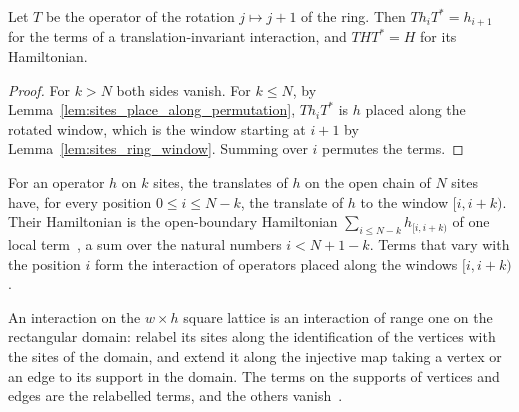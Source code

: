 \begin{lemma}
    \label{lem:hamiltonians_translation_invariant}
    \leanok
    Let $T$ be the operator of the rotation $j\mapsto j+1$ of the ring. Then $Th_iT^*=h_{i+1}$
    for the terms of a translation-invariant interaction, and $THT^*=H$ for its
    Hamiltonian.
\end{lemma}
\begin{proof}\leanok
    For $k>N$ both sides vanish. For $k\le N$, by
    Lemma~\ref{lem:sites_place_along_permutation}, $Th_iT^*$ is $h$ placed along the
    rotated window, which is the window starting at $i+1$ by Lemma~\ref{lem:sites_ring_window}.
    Summing over $i$ permutes the terms.
\end{proof}

\begin{definition}
    \label{def:hamiltonians_chain_translates}
    \leanok
    For an operator $h$ on $k$ sites, the translates of $h$ on the open chain of $N$ sites
    have, for every position $0\le i\le N-k$, the translate of $h$ to the window $[i,i+k)$.
    Their Hamiltonian is the open-boundary Hamiltonian $\sum_{i\le N-k}h_{[i,i+k)}$ of one
    local term~\cite{Landau2013PolynomialTime}, a sum over the natural numbers
    $i<N+1-k$. Terms that vary with the position $i$ form the interaction of operators
    placed along the windows $[i,i+k)$.
\end{definition}

\begin{definition}
    \label{def:hamiltonians_rectangle_to_plane}
    \leanok
    An interaction on the $w\times h$ square lattice is an interaction of range one on
    the rectangular domain: relabel its sites along the identification of the vertices
    with the sites of the domain, and extend it along the injective map taking a vertex
    or an edge to its support in the domain. The terms on the supports of vertices and
    edges are the relabelled terms, and the others
    vanish~\cite{OpenAI2026AreaLaw, OpenAI2026PolynomialPEPS}.
\end{definition}

